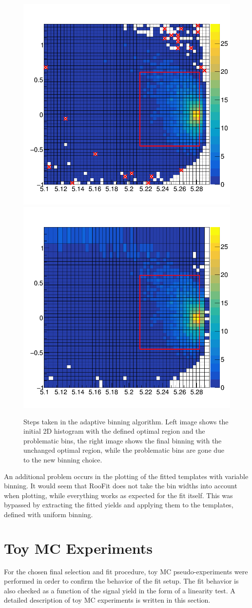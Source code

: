 \begin{figure}[H]
	\centering
	\captionsetup{width=0.8\linewidth}
	\includegraphics[width=0.49\linewidth]{fig/adaptive_1}
	\includegraphics[width=0.49\linewidth]{fig/adaptive_15}
	\caption{Steps taken in the adaptive binning algorithm. Left image shows the initial 2D histogram with the defined optimal region and the problematic bins, the right image shows the final binning with the unchanged optimal region, while the problematic bins are gone due to the new binning choice.}
	\label{fig:adapt}
\end{figure}

An additional problem occurs in the plotting of the fitted templates with variable binning. It would seem that RooFit does not take the bin widths into account when plotting, while everything works as expected for the fit itself. This was bypassed by extracting the fitted yields and applying them to the templates, defined with uniform binning.

\section{Toy MC Experiments}

For the chosen final selection and fit procedure, toy MC pseudo-experiments were performed in order to confirm the behavior of the fit setup. The fit behavior is also checked as a function of the signal yield in the form of a linearity test. A detailed description of toy MC experiments is written in this section.

